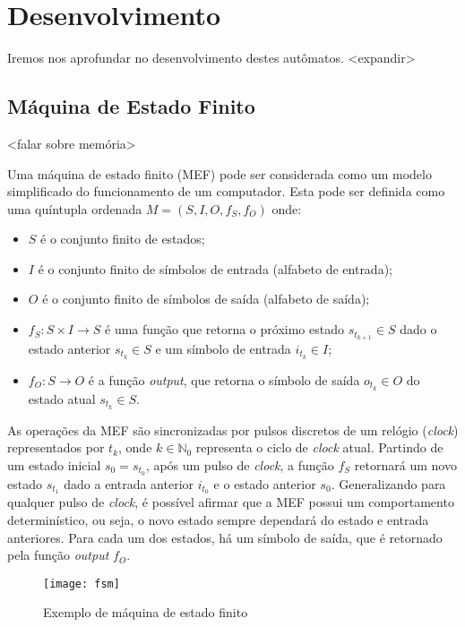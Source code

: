 \section{Desenvolvimento}

Iremos nos aprofundar no desenvolvimento destes autômatos. <expandir>

\subsection{Máquina de Estado Finito}

<falar sobre memória>

Uma máquina de estado finito (MEF) pode ser considerada como um modelo
simplificado do funcionamento de um computador. Esta pode ser definida como uma
quíntupla ordenada $M = (S, I, O, f_S, f_O)$ onde:
\begin{itemize}
    \item $S$ é o conjunto finito de estados;
    \item $I$ é o conjunto finito de símbolos de entrada (alfabeto de entrada);
    \item $O$ é o conjunto finito de símbolos de saída (alfabeto de saída);
    \item $f_S: S \times I \rightarrow S$ é uma função que retorna o próximo
          estado $s_{t_{k+1}} \in S$ dado o estado anterior $s_{t_k} \in S$ e
          um símbolo de entrada $i_{t_k} \in I$;
    \item $f_O: S \rightarrow O$ é a função \textit{output}, que retorna o
          símbolo de saída $o_{t_k} \in O$ do estado atual $s_{t_k} \in S$.
\end{itemize}

As operações da MEF são sincronizadas por pulsos discretos de um relógio
(\emph{clock}) representados por $t_k$, onde $k \in \mathbb{N}_0$ representa o
ciclo de \textit{clock} atual. Partindo de um estado inicial $s_0 = s_{t_0}$,
após um pulso de \textit{clock}, a função $f_S$ retornará um novo estado
$s_{t_1}$ dado a entrada anterior $i_{t_0}$ e o estado anterior $s_0$.
Generalizando para qualquer pulso de \textit{clock}, é possível afirmar que a
MEF possui um comportamento determinístico, ou seja, o novo estado sempre
dependará do estado e entrada anteriores. Para cada um dos estados, há um
símbolo de saída, que é retornado pela função \textit{output} $f_O$.

\begin{figure}[H]
    \centering
    \texttt{[image: fsm]}
    \caption{Exemplo de máquina de estado finito}
\end{figure}

